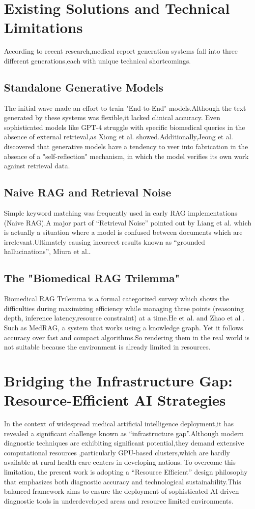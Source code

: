 \section{Existing Solutions and Technical Limitations
}
According to recent research,medical report generation systems fall into three different generations,each with unique technical shortcomings.
\subsection{Standalone Generative Models}
The initial wave made an effort to train "End-to-End" models.Although the text generated by these systems was flexible,it lacked clinical accuracy. Even sophisticated models like GPT-4 struggle with specific biomedical queries in the absence of external retrieval,as Xiong et al.\cite{Xiong2024}  showed.Additionally,Jeong et al.\cite{Jeong2024} discovered that generative models have a tendency to veer into fabrication in the absence of a "self-reflection" mechanism, in which the model verifies its own work against retrieval data.
\subsection{Naive RAG and Retrieval Noise}
Simple keyword matching was frequently used in early RAG implementations (Naive RAG).A major part of “Retrieval Noise” pointed out by Liang et al.\cite{Liang2025} which is actually a situation where a model is confused between documents which are irrelevant.Ultimately causing incorrect results known as “grounded hallucinations”, Miura et al.\cite{Miura2021}.
\subsection{ The "Biomedical RAG Trilemma"}
Biomedical RAG Trilemma is a formal categorized survey which shows the difficulties during maximizing efficiency while managing three points  (reasoning depth, inference latency,resource constraint) at a time.He et al. \cite{He2025} and Zhao et al\cite{Zhao2026} .
Such as MedRAG, a system that works using a knowledge graph. Yet it follows accuracy over fast and compact algorithms.So rendering them in the real world is not suitable because the environment is already limited in resources.

\section{Bridging the Infrastructure Gap: Resource-Efficient AI Strategies}
In the context of widespread medical artificial intelligence deployment,it has revealed a significant challenge known as “infrastructure gap”.Although modern diagnostic techniques are exhibiting significant potential,they demand extensive computational resources ,particularly GPU-based clusters,which are hardly available at rural health care centers in developing nations. To overcome this limitation, the present work is adopting a “Resource Efficient” design philosophy that emphasizes both diagnostic accuracy and  technological sustainability.This balanced framework aims to ensure the deployment of sophisticated AI-driven diagnostic tools in underdeveloped areas and resource limited environments.

